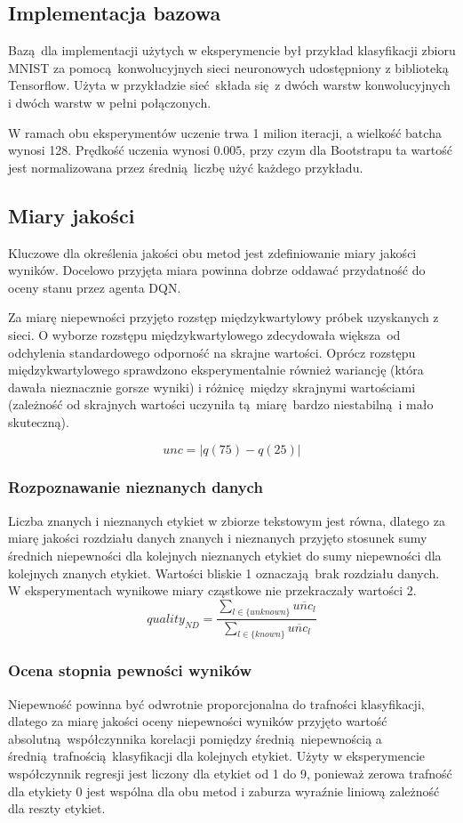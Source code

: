 \subsection{Implementacja bazowa}
Bazą dla implementacji użytych w eksperymencie był przykład klasyfikacji zbioru MNIST za pomocą konwolucyjnych sieci neuronowych udostępniony z biblioteką Tensorflow. Użyta w przykładzie sieć składa się z dwóch warstw konwolucyjnych i dwóch warstw w pełni połączonych.

W ramach obu eksperymentów uczenie trwa 1 milion iteracji, a wielkość batcha wynosi 128. Prędkość uczenia wynosi $0.005$, przy czym dla Bootstrapu ta wartość jest normalizowana przez średnią liczbę użyć każdego przykładu.

\subsection{Miary jakości}
Kluczowe dla określenia jakości obu metod jest zdefiniowanie miary jakości wyników. Docelowo przyjęta miara powinna dobrze oddawać przydatność do oceny stanu przez agenta DQN.

Za miarę niepewności przyjęto rozstęp międzykwartylowy próbek uzyskanych z sieci. O wyborze rozstępu międzykwartylowego zdecydowała większa od odchylenia standardowego odporność na skrajne wartości. Oprócz rozstępu międzykwartylowego sprawdzono eksperymentalnie również wariancję (która dawała nieznacznie gorsze wyniki) i różnicę między skrajnymi wartościami (zależność od skrajnych wartości uczyniła tą miarę bardzo niestabilną i mało skuteczną).

\[ unc = |q(75) -q(25)|\]

\subsubsection{Rozpoznawanie nieznanych danych}
Liczba znanych i nieznanych etykiet w zbiorze tekstowym jest równa, dlatego za miarę jakości rozdziału danych znanych i nieznanych przyjęto stosunek sumy średnich niepewności dla kolejnych nieznanych etykiet do sumy niepewności dla kolejnych znanych etykiet. Wartości bliskie 1 oznaczają brak rozdziału danych. W eksperymentach wynikowe miary cząstkowe nie przekraczały wartości 2.
\[ quality_{ND} = \frac{\sum_{l \in \{unknown\}} \overline{unc_{l}}}{\sum_{l \in \{known\}} \overline{unc_{l}}}\]

\subsubsection{Ocena stopnia pewności wyników }
Niepewność powinna być odwrotnie proporcjonalna do trafności klasyfikacji, dlatego za miarę jakości oceny niepewności wyników przyjęto wartość absolutną współczynnika korelacji pomiędzy średnią niepewnością a średnią trafnością klasyfikacji dla kolejnych etykiet. Użyty w eksperymencie współczynnik regresji jest liczony dla etykiet od 1 do 9, ponieważ zerowa trafność dla etykiety 0 jest wspólna dla obu metod i zaburza wyraźnie liniową zależność dla reszty etykiet.

